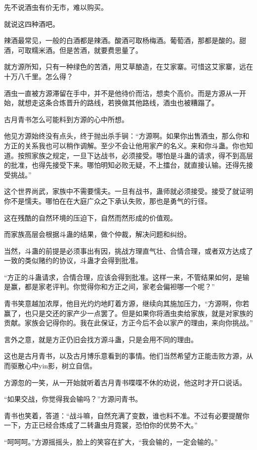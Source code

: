 \begin{this_body}
先不说酒虫有价无市，难以购买。

就说这四种酒吧。

辣酒最常见，一般的白酒都是辣酒。酸酒可取杨梅酒。葡萄酒，那都是酸的。甜酒，可取糯米酒。但是苦酒，就要费思量了。

就方源所知，只有一种绿色的苦酒，用艾草酿造，在艾家寨。可惜这艾家寨，远在十万八千里。怎么得？

酒虫一直被方源滞留在手中，并不是他待价而沽，想卖个高价。而是方源从一开始，就想走这条合炼晋升的路线，若换做其他路线，酒虫也被糟蹋了。

古月青书怎么可能料到方源的心中所想。

他见方源始终没有点头，终于抛出杀手锏：“方源啊。如果你出售酒虫，那么你和方正的关系我也可以稍作调解。至少不会让他用家产的名义。来和你斗蛊。你也知道。按照家族之规定，一旦下达战书，必须接受。哪怕是斗蛊的请求，得不到高层的批准，也得先接受下来。哪怕明知必败无疑，不上擂台，就直接认输。还得先接受挑战。”

这个世界尚武，家族中不需要懦夫。一旦有战书，蛊师就必须接受。接受了就证明你不是懦夫。哪怕在在大庭广众之下承认失败，那也是勇气的行径。

这在残酷的自然环境的压迫下，自然而然形成的价值观。

而家族高层会根据斗蛊的结果，做个仲裁，解决问题和纠纷。

当然，斗蛊的前提是必须事出有因，挑战方理直气壮、合情合理，或者双方达成了一致的类似赌约的协议，斗蛊才会得到批准。

“方正的斗蛊请求，合情合理，应该会得到批准。这样一来，不管结果如何，是输是赢，都是家老评判。你觉得你和方正之间，家老会偏袒哪一个呢？”

青书笑意越加浓厚，他目光灼灼地盯着方源，继续向其施加压力，“方源啊，你若赢了，也只是交还的家产少一点罢了。但是如果你将酒虫卖给家族，就是对家族的贡献。家族会记得你的。我在此保证，方正今后不会以家产的理由，来向你挑战。”

言外之意，就是方正仍旧会找方源斗蛊，只是会用不同的理由。

这也是古月青书，以及古月博乐意看到的事情。他们当然希望方正能击败方源，从而驱散心中yin影，树立自信。

方源忽的一笑，从一开始就听着古月青书喋喋不休的劝说，他这时才开口说话。

“如果交战，你觉得我会输吗？”方源问青书。

青书也笑着，答道：“战斗嘛，自然充满了变数，谁也料不准。不过有必要提醒你一下，方正已经合炼成了二转蛊虫月霓裳，恐怕你的优势不大。”

“呵呵呵。”方源摇摇头，脸上的笑容在扩大，“我会输的，一定会输的。”


\end{this_body}
